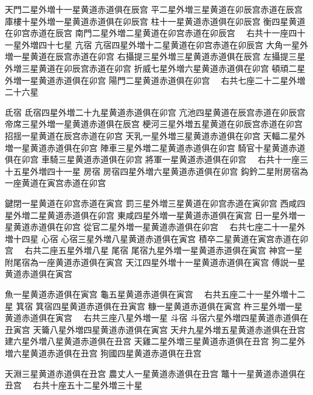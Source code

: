\begin{正文}
\par
天門二星外増十一星黄道赤道俱在辰宫
平二星外増三星黄道在卯辰宫赤道在辰宫
庫樓十星外増一星黄道赤道俱在卯辰宫
柱十一星黄道赤道俱在卯辰宫
衡四星黄道在卯宫赤道在辰宫
南門二星外増二星黄道在卯宫赤道在卯辰宫
　右共十一座四十一星外増四十七星
亢宿
亢宿四星外増十二星黄道在卯宫赤道在卯辰宫
大角一星外増一星黄道在辰宫赤道在卯宫
右攝提三星外増三星黄道赤道俱在辰宫
左攝提三星外増三星黄道在卯辰宫赤道在卯宫
折威七星外増六星黄道赤道俱在卯宫
頓頑二星外増一星黄道赤道俱在卯宫
陽門二星黄道赤道俱在卯宫
　右共七座二十二星外増二十六星
\par
氐宿
氐宿四星外増二十九星黄道赤道俱在卯宫
亢池四星黄道在辰宫赤道在卯辰宫
帝席三星外増一星黄道赤道俱在辰宫
梗河三星外増五星黄道在卯辰宫赤道在卯宫
招揺一星黄道在辰宫赤道在卯宫
天乳一星外増三星黄道赤道俱在卯宫
天輻二星外増一星黄道赤道俱在卯宫
陣車三星外増二星黄道赤道俱在卯宫
騎官十星黄道赤道俱在卯宫
車騎三星黄道赤道俱在卯宫
將軍一星黄道赤道俱在卯宫
　右共十一座三十五星外増四十一星
房宿
房宿四星外増六星黄道赤道俱在卯宫
鈎鈐二星附房宿為一座黄道在寅宫赤道在卯宫
\par
鍵閉一星黄道在卯宫赤道在寅宫
罰三星外増三星黄道在卯宫赤道在寅卯宫
西咸四星外増二星黄道赤道俱在卯宫
東咸四星外増一星黄道赤道俱在寅宫
日一星外増一星黄道赤道俱在卯宫
從官二星外増一星黄道赤道俱在卯宫
　右共七座二十一星外増十四星
心宿
心宿三星外増八星黄道赤道俱在寅宫
積卒二星黄道在寅宫赤道在卯宫
　右共二座五星外増八星
尾宿
尾宿九星外増一星黄道赤道俱在寅宫
神宫一星附尾宿為一座黄道赤道俱在寅宫
天江四星外増十一星黄道赤道俱在寅宫
傅説一星黄道赤道俱在寅宫
\par
魚一星黄道赤道俱在寅宫
龜五星黄道赤道俱在寅宫
　右共五座二十一星外増十二星
箕宿
箕宿四星黄道赤道俱在丑寅宫
糠一星黄道赤道俱在寅宫
杵三星外増一星黄道赤道俱在寅宫
　右共三座八星外増一星
斗宿
斗宿六星外増四星黄道赤道俱在丑寅宫
天籥八星外増四星黄道赤道俱在寅宫
天弁九星外増五星黄道赤道俱在丑宫
建六星外増八星黄道赤道俱在丑宫
天雞二星外増三星黄道赤道俱在丑宫
狗二星外増六星黄道赤道俱在丑宫
狗國四星黄道赤道俱在丑宫
\par
天淵三星黄道赤道俱在丑宫
農丈人一星黄道赤道俱在丑宫
鼈十一星黄道赤道俱在丑宫
　右共十座五十二星外増三十星

\end{正文}
